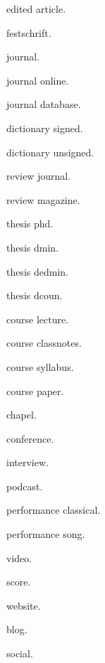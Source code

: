 \documentclass[font=termes]{mbts}
\begin{document}
\noindent edited article.\autocite[12]{edited-article}\par
\noindent festschrift.\autocite[12]{festschrift}\par
\noindent journal.\autocite[12]{journal}\par
\noindent journal online.\autocite[12]{journal-online}\par
\noindent journal database.\autocite[12]{journal-database}\par
\noindent dictionary signed.\autocite[12]{dictionary-signed}\par
\newpage
\noindent dictionary unsigned.\autocite{dictionary-unsigned}\par
\noindent review journal.\autocite[12]{review-journal}\par
\noindent review magazine.\autocite[12]{review-magazine}\par
\noindent thesis phd.\autocite[12]{thesis-phd}\par
\noindent thesis dmin.\autocite[12]{thesis-dmin}\par
\noindent thesis dedmin.\autocite[12]{thesis-dedmin}\par
\noindent thesis dcoun.\autocite[12]{thesis-dcoun}\par
\noindent course lecture.\autocite{course-lecture}\par
\newpage
\noindent course classnotes.\autocite{course-classnotes}\par
\noindent course syllabus.\autocite[12]{course-syllabus}\par
\noindent course paper.\autocite[12]{course-paper}\par
\noindent chapel.\autocite{chapel}\par
\noindent conference.\autocite{conference}\par
\noindent interview.\autocite{interview}\par
\noindent podcast.\autocite{podcast}\par
\noindent performance classical.\autocite{performance-classical}\par
\newpage
\noindent performance song.\autocite{performance-song}\par
\noindent video.\autocite{video}\par
\noindent score.\autocite{score}\par
\noindent website.\autocite{website}\par
\noindent blog.\autocite{blog}\par
\noindent social.\autocite{social}\par
\end{document}
